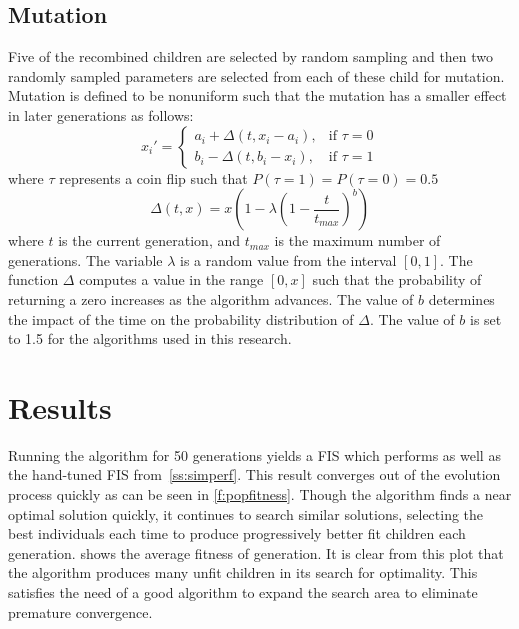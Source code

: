 \subsection{Mutation} Five of the recombined children are selected by random sampling and then two randomly
sampled parameters are selected from each of these child for mutation. Mutation is defined to be nonuniform
such that the mutation has a smaller effect in later generations as follows: \begin{displaymath} x_i'=
    \begin{cases} a_i+\Delta(t,x_i-a_i),& \text{if }\tau=0\\ b_i-\Delta(t,b_i-x_i),& \text{if }\tau=1
    \end{cases} \end{displaymath} where $\tau$ represents a coin flip such that $P(\tau=1)=P(\tau=0)=0.5$
     
    \begin{displaymath} \Delta(t,x)=x(1-\lambda(1-\frac{t}{t_{max}})^b) \end{displaymath}
        \noindent where $t$ is the current generation, and
        $t_{max}$ is the maximum number of generations. The variable $\lambda$ is a random value from the
        interval $[0,1]$. The function $\Delta$ computes a value in the range $[0,x]$ such that the
        probability of returning a zero increases as the algorithm advances. The value of $b$ determines the
        impact of the time on the probability distribution of $\Delta$. The value of $b$ is set to 1.5 for
         the algorithms used in this research.

\section{Results} Running the algorithm for 50 generations yields a FIS which
performs as well as the hand-tuned FIS from~\cref{ss:simperf}. This result converges out of the evolution
process quickly as can be seen in \cref{f:popfitness}. Though the algorithm finds a near optimal
solution quickly, it continues to search similar solutions, selecting the best individuals each time to
produce progressively better fit children each generation.  shows the average
fitness of generation. It is clear from this plot that the algorithm produces many unfit children in its
search for optimality. This satisfies the need of a good algorithm to expand the search area to eliminate
premature convergence.

